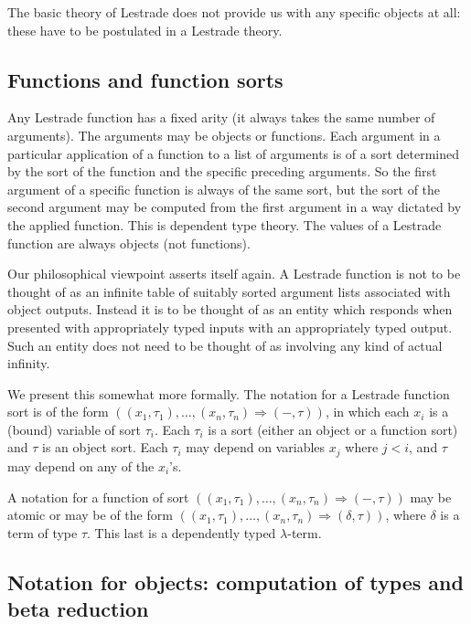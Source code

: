 \documentclass[12pt]{article}
\begin{document}
The basic theory of Lestrade does not provide us with any specific objects at all:  these have to be postulated in a Lestrade theory.

\subsection{Functions and function sorts}

Any Lestrade function has a fixed arity (it always takes the same number of arguments).  The arguments may be objects or functions.  Each argument in a particular application of a function to a list of arguments is of a sort determined by the sort of the function and the specific preceding arguments.   So the first
argument of a specific function is always of the same sort, but the sort of the second argument may be computed from the first argument in a way dictated by the applied function.  This is dependent type theory.  The values of a Lestrade function are always objects (not functions).

Our philosophical viewpoint asserts itself again.  A Lestrade function is not to be thought of as an infinite table of suitably sorted argument lists associated with object outputs.  Instead it is to be thought of as an entity which responds when presented with appropriately typed inputs with an appropriately typed output.  Such an entity does not need to be thought of as involving any kind of actual infinity.

We present this somewhat more formally.  The notation for a Lestrade function sort is of the form $((x_1,\tau_1),\ldots,(x_n,\tau_n) \Rightarrow (-,\tau))$,
in which each $x_i$ is a (bound) variable of sort $\tau_i$.  Each $\tau_i$ is a sort (either an object or a function sort) and $\tau$ is an object sort.
Each $\tau_i$ may depend on variables $x_j$ where $j<i$, and $\tau$ may depend on any of the $x_i$'s.

A notation for a function of sort $((x_1,\tau_1),\ldots,(x_n,\tau_n) \Rightarrow (-,\tau))$ may be atomic or may be of the form  $((x_1,\tau_1),\ldots,(x_n,\tau_n) \Rightarrow (\delta,\tau))$, where $\delta$ is a term of type $\tau$.  This last is a dependently typed $\lambda$-term.

\subsection{Notation for objects:  computation of types and beta reduction}
\end{document}

